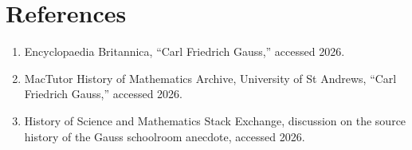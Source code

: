 \documentclass[12pt]{article}
\begin{document}
\section*{References}

\begin{enumerate}
    \item Encyclopaedia Britannica, ``Carl Friedrich Gauss,'' accessed 2026.
    \item MacTutor History of Mathematics Archive, University of St Andrews, ``Carl Friedrich Gauss,'' accessed 2026.
    \item History of Science and Mathematics Stack Exchange, discussion on the source history of the Gauss schoolroom anecdote, accessed 2026.
\end{enumerate}
\end{document}
